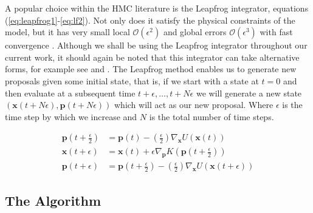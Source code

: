 A popular choice within the HMC literature is the Leapfrog integrator, equations (\ref{eq:leapfrog1}-\ref{eq:lf2}). Not only does it satisfy the physical constraints of the model, but it has very small local  $\mathcal{O}(\epsilon^{2})$ and global errors $\mathcal{O}(\epsilon^{3})$ with fast convergence \citep{neal2011mcmc}. Although we shall be using the Leapfrog integrator throughout our current work, it should again be noted that this integrator can take alternative forms, for example see \citep{girolami2011riemann}\citep{nishimura2017discontinuous} and \citep{blanes2012explicit}. The Leapfrog method enables us to generate new proposals given some initial state, that is, if we start with a state at $t = 0$ and then evaluate at a subsequent time $t + \epsilon , \hdots, t + N\epsilon$ we will generate a new state $(\textbf{x}(t + N\epsilon),\textbf{p}(t + N\epsilon))$ which will act as our new proposal. Where $\epsilon$ is the time step by which we increase and $N$ is the total number of time steps.

\begin{align}
\label{eq:leapfrog1}
\textbf{p}(t + \frac{\epsilon}{2}) &= \textbf{p}(t) - \left(\frac{\epsilon}{2}\right) \nabla_\textbf{x}U(\textbf{x}(t)) \\
\textbf{x}(t + \epsilon) &= \textbf{x}(t) + \epsilon \nabla_{\textbf{p}}K(\textbf{p}(t + \frac{\epsilon}{2}))\\
\label{eq:lf2}
\textbf{p}(t + \epsilon) &= \textbf{p}(t + \frac{\epsilon}{2}) - \left(\frac{\epsilon}{2}\right)\nabla_{\textbf{x}} U(\textbf{x}(t+\epsilon))
\end{align}
\subsection{The Algorithm}


